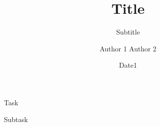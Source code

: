 \documentclass{preamble}
\title{Title}
\subtitle{Subtitle}
\author{Author 1 \authorsep Author 2}
\date{Date1}
\begin{document}
\maketitle

\begin{task}[credit = 10]{Task}
    \begin{subtask*}[credit = 2]{Subtask}

    \end{subtask*}
\end{task}
\end{document}
